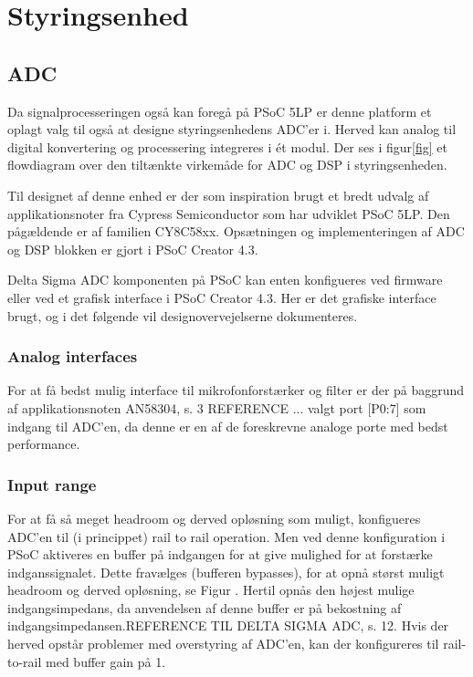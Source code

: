 \section{Styringsenhed}\label{sec:Styringsenhed:design}
\subsection{ADC}

Da signalprocesseringen også kan foregå på PSoC 5LP er denne platform et oplagt valg til også at designe styringsenhedens ADC'er i. Herved kan analog til digital konvertering og processering integreres i ét modul. Der ses i figur\tbr \ref{fig} et flowdiagram over den tiltænkte virkemåde for ADC og DSP i styringsenheden. 

Til designet af denne enhed er der som inspiration brugt et bredt udvalg af applikationsnoter fra Cypress Semiconductor som har udviklet PSoC 5LP. Den pågældende er af familien CY8C58xx. Opsætningen og implementeringen af ADC og DSP blokken er gjort i PSoC Creator 4.3. 

Delta Sigma ADC komponenten på PSoC kan enten konfigueres ved firmware eller ved et grafisk interface i PSoC Creator 4.3. Her er det grafiske interface brugt, og i det følgende vil designovervejelserne dokumenteres.

\subsubsection{Analog interfaces}
For at få bedst mulig interface til mikrofonforstærker og filter er der på baggrund af applikationsnoten AN58304, s. 3 \tbr REFERENCE  ... valgt port [P0:7] som indgang til ADC'en, da denne er en af de foreskrevne analoge porte med bedst performance. 

\subsubsection{Input range}
For at få så meget headroom og derved opløsning som muligt, konfigueres ADC'en til (i princippet) rail to rail operation. Men ved denne konfiguration i PSoC aktiveres en buffer på indgangen for at give mulighed for at forstærke indganssignalet. Dette fravælges (bufferen bypasses), for at opnå størst muligt headroom og derved opløsning, se Figur . Hertil opnås den højest mulige indgangsimpedans,  da anvendelsen af denne buffer er på bekostning af indgangsimpedansen.\tbr REFERENCE TIL DELTA SIGMA ADC, s. 12. Hvis der herved opstår problemer med overstyring af ADC'en, kan der konfigureres til rail-to-rail med buffer gain på 1. 

